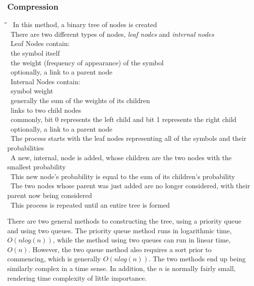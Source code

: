 \documentclass[10pt,letterpaper]{scrartcl}
\newcommand{\tbul}{\textbullet}
\newcommand{\tend}{\>\textendash}
\newcommand{\tasc}{\>\>\textasteriskcentered}
\newcommand{\tabDef}{\hspace{2em}\=\hspace{2em}\=\hspace{2em}\=\hspace{2em}\=\kill}
\begin{document}
\subsubsection{Compression}
\begin{tabbing}\tabDef 
\tbul\ In this method, a binary tree of nodes is created \\
\tbul\ There are two different types of nodes, \textit{leaf nodes} and \textit{internal nodes} \\
\tbul\ Leaf Nodes contain: \\
	\tend\ the symbol itself \\
    \tend\ the weight (frequency of appearance) of the symbol \\
    \tend\ optionally, a link to a parent node \\
\tbul\ Internal Nodes contain: \\
	\tend\ symbol weight \\
        \tasc\ generally the sum of the weights of its children \\
    \tend\ links to two child nodes \\
    	\tasc\ commonly, bit 0 represents the left child and bit 1 represents the right child \\
    \tend\ optionally, a link to a parent node \\
\tbul\ The process starts with the leaf nodes representing all of the symbols and their probabilities \\
\tbul\ A new, internal, node is added, whose children are the two nodes with the smallest probability \\
\tbul\ This new node's probability is equal to the sum of its children's probability \\ 
\tbul\ The two nodes whose parent was just added are no longer considered, with their parent now being considered \\
\tbul\ This process is repeated until an entire tree is formed
\end{tabbing}
There are two general methods to constructing the tree, using a priority queue and using two queues. The priority queue method runs in logarithmic time, $O(nlog(n))$, while the method using two queues can run in linear time, $O(n)$. However, the two queue method also requires a sort prior to commencing, which is generally $O(nlog(n))$. The two methods end up being similarly complex in a time sense. In addition, the $n$ is normally fairly small, rendering time complexity of little importance. 
\end{document}
